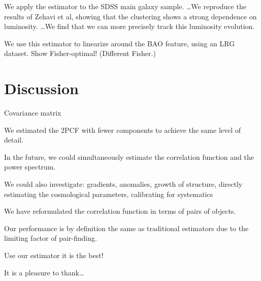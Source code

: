 \documentclass[modern]{aastex62}
\begin{document}
We apply the estimator to the SDSS main galaxy sample. \ldots We reproduce the results of Zehavi et al, showing that the clustering shows a strong dependence on luminosity. \ldots We find that we can more precisely track this luminosity evolution.

We use this estimator to linearize around the BAO feature, using an LRG dataset. Show Fisher-optimal! (Different Fisher.)

\section{Discussion}

Covariance matrix

We estimated the 2PCF with fewer components to achieve the same level of detail.

In the future, we could simultaneously estimate the correlation function and the power spectrum.

We could also investigate: gradients, anomalies, growth of structure, directly estimating the cosmological parameters, calibrating for systematics

We have reformulated the correlation function in terms of pairs of objects.

Our performance is by definition the same as traditional estimators due to the limiting factor of pair-finding.

Use our estimator it is the best!

\acknowledgements
It is a pleasure to thank\ldots
\end{document}
